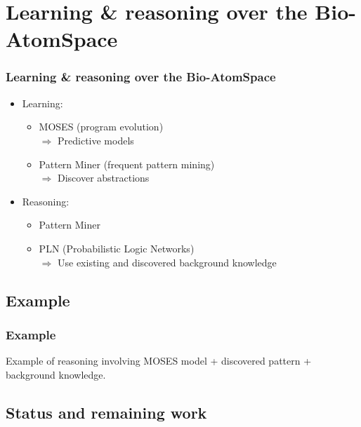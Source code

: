 \documentclass[aspectratio=169]{beamer}
\begin{document}
\section{Learning \& reasoning over the Bio-AtomSpace}

\begin{frame}
  \frametitle{Learning \& reasoning over the Bio-AtomSpace}

  \begin{itemize}
  \item Learning:\\
    \begin{itemize}
    \item MOSES (program evolution)\\
      $\Rightarrow$ \alert{Predictive models}
    \item Pattern Miner (frequent pattern mining)\\
      $\Rightarrow$ \alert{Discover abstractions}
    \end{itemize}
  \item Reasoning:\\
    \begin{itemize}
    \item Pattern Miner
    \item PLN (Probabilistic Logic Networks)\\
      $\Rightarrow$ \alert{Use existing and discovered background knowledge}
    \end{itemize}
  \end{itemize}
  
\end{frame}

\subsection{Example}

\begin{frame}
  \frametitle{Example}

  Example of reasoning involving MOSES model + discovered pattern +
  background knowledge.
\end{frame}

\subsection{Status and remaining work}
\end{document}
